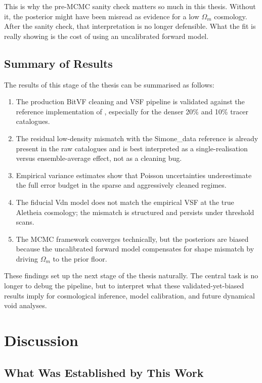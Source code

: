 \documentclass[12pt]{report}
\begin{document}
This is why the pre-MCMC sanity check matters so much in this thesis. Without it, the posterior might have been misread as evidence for a low $\Omega_m$ cosmology. After the sanity check, that interpretation is no longer defensible. What the fit is really showing is the cost of using an uncalibrated forward model.

\section{Summary of Results}

The results of this stage of the thesis can be summarised as follows:
\begin{enumerate}
    \item The production BitVF cleaning and VSF pipeline is validated against the reference implementation of \citet{Sartori2025}, especially for the denser 20\% and 10\% tracer catalogues.
    \item The residual low-density mismatch with the Simone\_data reference is already present in the raw catalogues and is best interpreted as a single-realisation versus ensemble-average effect, not as a cleaning bug.
    \item Empirical variance estimates show that Poisson uncertainties underestimate the full error budget in the sparse and aggressively cleaned regimes.
    \item The fiducial Vdn model does not match the empirical VSF at the true Aletheia cosmology; the mismatch is structured and persists under threshold scans.
    \item The MCMC framework converges technically, but the posteriors are biased because the uncalibrated forward model compensates for shape mismatch by driving $\Omega_m$ to the prior floor.
\end{enumerate}

These findings set up the next stage of the thesis naturally. The central task is no longer to debug the pipeline, but to interpret what these validated-yet-biased results imply for cosmological inference, model calibration, and future dynamical void analyses.

\chapter{Discussion}
\label{chap:discussion}

\section{What Was Established by This Work}
\end{document}
